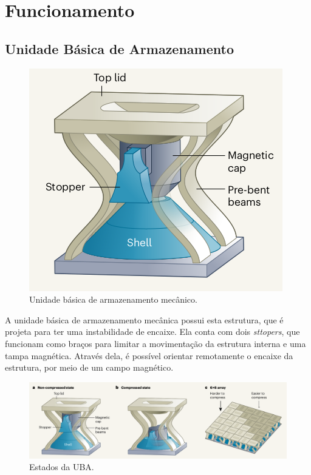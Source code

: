 \section{Funcionamento}

\subsection{Unidade Básica de Armazenamento}
\begin{figure}[H]
    \centering
    \includegraphics[scale = 0.5]{source/pictures/shell.png}
    \caption{Unidade básica de armazenamento mecânico\cite{coulais2021snappy}.}
    \label{fig:uba}
\end{figure}

A unidade básica de armazenamento mecânica possui esta estrutura, que é projeta para ter uma instabilidade de encaixe. Ela conta com dois \textit{sttopers}, que funcionam como braços para limitar a movimentação da estrutura interna e uma tampa magnética. Através dela, é possível orientar remotamente o encaixe da estrutura, por meio de um campo magnético.


\begin{figure}[H]
    \centering
    \includegraphics[width = \textwidth]{source/pictures/shell-work.png}
    \caption{Estados da UBA\cite{coulais2021snappy}.}
    \label{fig:uba-states}
\end{figure}


